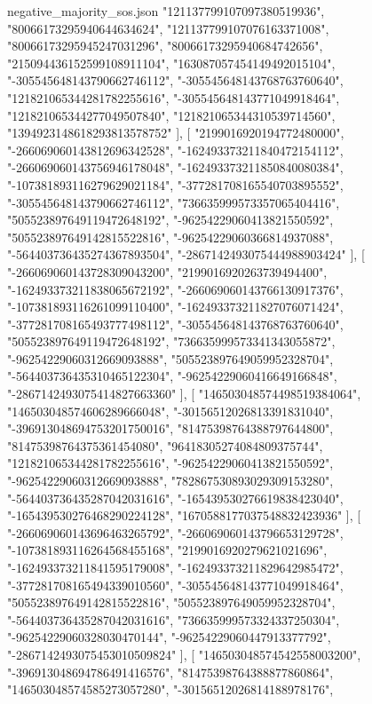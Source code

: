 \begin{filecontents*}[overwrite]{negative_majority_sos.json}
    "121137799107097380519936",
    "80066173295940644634624",
    "121137799107076163371008",
    "80066173295945247031296",
    "80066173295940684742656",
    "215094436152599108911104",
    "163087057454149492015104",
    "-305545648143790662746112",
    "-305545648143768763760640",
    "121821065344281782255616",
    "-305545648143771049918464",
    "121821065344277049507840",
    "121821065344310539714560",
    "1394923148618293813578752"
   ],
   [
    "2199016920194772480000",
    "-266069060143812696342528",
    "-162493373211840472154112",
    "-266069060143756946178048",
    "-162493373211850840080384",
    "-107381893116279629021184",
    "-377281708165540703895552",
    "-305545648143790662746112",
    "736635999573357065404416",
    "505523897649119472648192",
    "-96254229060413821550592",
    "505523897649142815522816",
    "-96254229060366814937088",
    "-564403736435274367893504",
    "-2867142493075444988903424"
   ],
   [
    "-266069060143728309043200",
    "2199016920263739494400",
    "-162493373211838065672192",
    "-266069060143766130917376",
    "-107381893116261099110400",
    "-162493373211827076071424",
    "-377281708165493777498112",
    "-305545648143768763760640",
    "505523897649119472648192",
    "736635999573341343055872",
    "-96254229060312669093888",
    "505523897649059952328704",
    "-564403736435310465122304",
    "-96254229060416649166848",
    "-2867142493075414827663360"
   ],
   [
    "146503048574498519384064",
    "146503048574606289666048",
    "-30156512026813391831040",
    "-396913048694753201750016",
    "81475398764388797644800",
    "81475398764375361454080",
    "96418305274084809375744",
    "121821065344281782255616",
    "-96254229060413821550592",
    "-96254229060312669093888",
    "782867530893029309153280",
    "-564403736435287042031616",
    "-165439530276619838423040",
    "-165439530276468290224128",
    "1670588177037548832423936"
   ],
   [
    "-266069060143696463265792",
    "-266069060143796653129728",
    "-107381893116264568455168",
    "2199016920279621021696",
    "-162493373211841595179008",
    "-162493373211829642985472",
    "-377281708165494339010560",
    "-305545648143771049918464",
    "505523897649142815522816",
    "505523897649059952328704",
    "-564403736435287042031616",
    "736635999573324337250304",
    "-96254229060328030470144",
    "-96254229060447913377792",
    "-2867142493075453010509824"
   ],
   [
    "146503048574542558003200",
    "-396913048694786491416576",
    "81475398764388877860864",
    "146503048574585273057280",
    "-30156512026814188978176",

\end{filecontents*}
